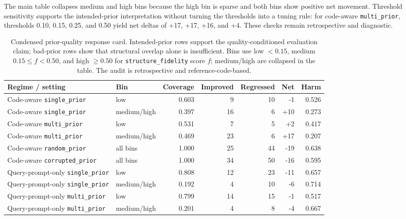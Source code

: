 \documentclass{article}
\begin{document}
The main table collapses medium and high bins because the high bin is sparse and both bins show positive net movement. Threshold sensitivity supports the intended-prior interpretation without turning the thresholds into a tuning rule: for code-aware \texttt{multi\_prior}, thresholds 0.10, 0.15, 0.25, and 0.50 yield net deltas of +17, +17, +16, and +4. These checks remain retrospective and diagnostic.

\begin{table}[t]
\centering
\scriptsize
\setlength{\tabcolsep}{3pt}
\begin{tabular}{llrrrrr}
\toprule
Regime / setting & Bin & Coverage & Improved & Regressed & Net & Harm \\
\midrule
Code-aware \texttt{single\_prior} & low & 0.603 & 9 & 10 & -1 & 0.526 \\
Code-aware \texttt{single\_prior} & medium/high & 0.397 & 16 & 6 & +10 & 0.273 \\
Code-aware \texttt{multi\_prior} & low & 0.531 & 7 & 5 & +2 & 0.417 \\
Code-aware \texttt{multi\_prior} & medium/high & 0.469 & 23 & 6 & +17 & 0.207 \\
Code-aware \texttt{random\_prior} & all bins & 1.000 & 25 & 44 & -19 & 0.638 \\
Code-aware \texttt{corrupted\_prior} & all bins & 1.000 & 34 & 50 & -16 & 0.595 \\
Query-prompt-only \texttt{single\_prior} & low & 0.808 & 12 & 23 & -11 & 0.657 \\
Query-prompt-only \texttt{single\_prior} & medium/high & 0.192 & 4 & 10 & -6 & 0.714 \\
Query-prompt-only \texttt{multi\_prior} & low & 0.799 & 14 & 15 & -1 & 0.517 \\
Query-prompt-only \texttt{multi\_prior} & medium/high & 0.201 & 4 & 8 & -4 & 0.667 \\
\bottomrule
\end{tabular}
\caption{Condensed prior-quality response card. Intended-prior rows support the quality-conditioned evaluation claim; bad-prior rows show that structural overlap alone is insufficient. Bins use low $<0.15$, medium $0.15\leq f<0.50$, and high $\geq0.50$ for \texttt{structure\_fidelity} score $f$; medium/high are collapsed in the table. The audit is retrospective and reference-code-based.}
\label{tab:quality-response}
\end{table}
\end{document}
